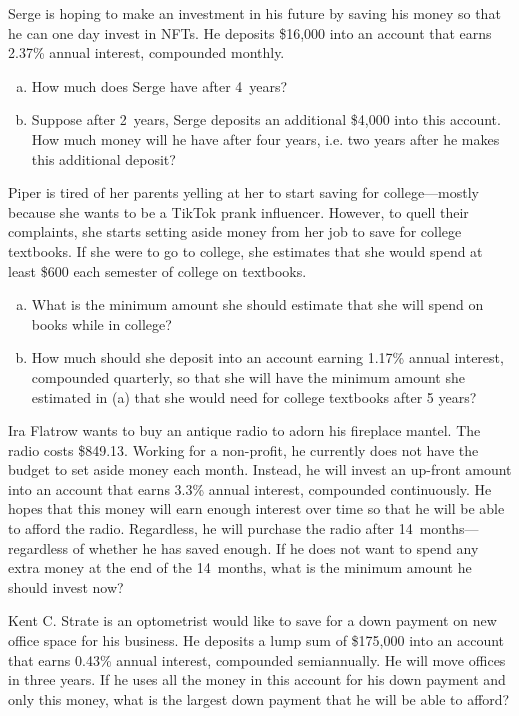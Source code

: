\documentclass[11pt,letterpaper]{article}
\begin{document}

 Serge is hoping to make an investment in his future by saving his money so that he can one day invest in NFTs. He deposits \$16,000 into an account that earns 2.37\% annual interest, compounded monthly.
	\begin{enumerate}[(a)]
	\item How much does Serge have after 4~years?
	\item Suppose after 2~years, Serge deposits an additional \$4,000 into this account. How much money will he have after four years, i.e. two years after he makes this additional deposit? 
	\end{enumerate}



\newpage



 Piper is tired of her parents yelling at her to start saving for college---mostly because she wants to be a TikTok prank influencer. However, to quell their complaints, she starts setting aside money from her job to save for college textbooks. If she were to go to college, she estimates that she would spend at least \$600 each semester of college on textbooks. 
	\begin{enumerate}[(a)]
	\item What is the minimum amount she should estimate that she will spend on books while in college? 
	\item How much should she deposit into an account earning 1.17\% annual interest, compounded quarterly, so that she will have the minimum amount she estimated in (a) that she would need for college textbooks after 5 years? 
	\end{enumerate}



\newpage



 Ira Flatrow wants to buy an antique radio to adorn his fireplace mantel. The radio costs \$849.13. Working for a non-profit, he currently does not have the budget to set aside money each month. Instead, he will invest an up-front amount into an account that earns 3.3\% annual interest, compounded continuously. He hopes that this money will earn enough interest over time so that he will be able to afford the radio. Regardless, he will purchase the radio after 14~months---regardless of whether he has saved enough. If he does not want to spend any extra money at the end of the 14~months, what is the minimum amount he should invest now? 




\newpage



 Kent C. Strate is an optometrist would like to save for a down payment on new office space for his business. He deposits a lump sum of \$175,000 into an account that earns 0.43\% annual interest, compounded semiannually. He will move offices in three years. If he uses all the money in this account for his down payment and only this money, what is the largest down payment that he will be able to afford?
\end{document}
